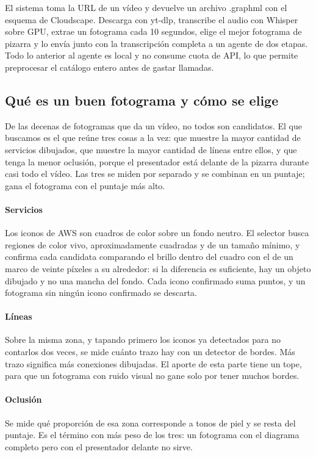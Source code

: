 \documentclass[a4paper, twocolumn, 10pt]{IEEEtran}
\begin{document}
El sistema toma la URL de un vídeo y devuelve un archivo .graphml con el esquema de Cloudscape. Descarga con yt-dlp, transcribe el audio con Whisper sobre GPU, extrae un fotograma cada 10 segundos, elige el mejor fotograma de pizarra y lo envía junto con la transcripción completa a un agente de dos etapas. Todo lo anterior al agente es local y no consume cuota de API, lo que permite preprocesar el catálogo entero antes de gastar llamadas. 
 
\subsection{Qué es un buen fotograma y cómo se elige}
 
De las decenas de fotogramas que da un vídeo, no todos son candidatos. El que buscamos es el que reúne tres cosas a la vez: que muestre la mayor cantidad de servicios dibujados, que muestre la mayor cantidad de líneas entre ellos, y que tenga la menor oclusión, porque el presentador está delante de la pizarra durante casi todo el vídeo. Las tres se miden por separado y se combinan en un puntaje; gana el fotograma con el puntaje más alto. 
 
\paragraph{Servicios} Los iconos de AWS son cuadros de color sobre un fondo neutro. El selector busca regiones de color vivo, aproximadamente cuadradas y de un tamaño mínimo, y confirma cada candidata comparando el brillo dentro del cuadro con el de un marco de veinte píxeles a su alrededor: si la diferencia es suficiente, hay un objeto dibujado y no una mancha del fondo. Cada icono confirmado suma puntos, y un fotograma sin ningún icono confirmado se descarta. 
 
\paragraph{Líneas} Sobre la misma zona, y tapando primero los iconos ya detectados para no contarlos dos veces, se mide cuánto trazo hay con un detector de bordes. Más trazo significa más conexiones dibujadas. El aporte de esta parte tiene un tope, para que un fotograma con ruido visual no gane solo por tener muchos bordes. 
 
\paragraph{Oclusión} Se mide qué proporción de esa zona corresponde a tonos de piel y se resta del puntaje. Es el término con más peso de los tres: un fotograma con el diagrama completo pero con el presentador delante no sirve. 
\end{document}
